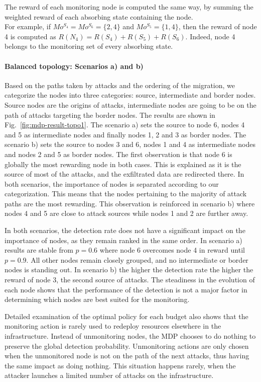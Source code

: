 The reward of each monitoring node is computed the same way, by summing the weighted reward of each absorbing state containing the node.\\
For example, if $Mo^{S_4} = Mo^{S_6} =\{2,4\}$ and $Mo^{S_5} = \{1,4\}$, then the reward of node 4 is computed as $R(N_4) = R(S_4) + R(S_5) + R(S_6)$. Indeed, node 4 belongs to the monitoring set of every absorbing state.



\paragraph{Balanced topology: Scenarios a) and b)}
Based on the paths taken by attacks and the ordering of the migration, we categorize the nodes into three categories: source, intermediate and border nodes. Source nodes are the origins of attacks, intermediate nodes are going to be on the path of attacks targeting the border nodes. 
The results are shown in Fig.~\ref{fig:mdp-result-topo1}.
The scenario a) sets the source to node 6, nodes 4 and 5 as intermediate nodes and finally nodes 1, 2 and 3 as border nodes.
The scenario b) sets the source to nodes 3 and 6, nodes 1 and 4 as intermediate nodes and nodes 2 and 5 as border nodes.
The first observation is that node 6 is globally the most rewarding node in both cases.
This is explained as it is the source of most of the attacks, and the exfiltrated data are redirected there.
In both scenarios, the importance of nodes is separated according to our categorization. 
This means that the nodes pertaining to the majority of attack paths are the most rewarding.
This observation is reinforced in scenario b) where nodes 4 and 5 are close to attack sources while nodes 1 and 2 are further away.

In both scenarios, the detection rate does not have a significant impact on the importance of nodes, as they remain ranked in the same order.
In scenario a) results are stable from $p=0.6$ where node 6 overcomes node 4 in reward until $p=0.9$. All other nodes remain closely grouped, and no intermediate or border nodes is standing out.
In scenario b) the higher the detection rate the higher the reward of node 3, the second source of attacks.
The steadiness in the evolution of each node shows that the performance of the detection is not a major factor in determining which nodes are best suited for the monitoring. 

Detailed examination of the optimal policy for each budget also shows that the monitoring action is rarely used to redeploy resources elsewhere in the infrastructure.
Instead of unmonitoring nodes, the MDP chooses to do nothing to preserve the global detection probability.
Unmonitoring actions are only chosen when the unmonitored node is not on the path of the next attacks, thus having the same impact as doing nothing. 
This situation happens rarely, when the attacker launches a limited number of attacks on the infrastructure.

